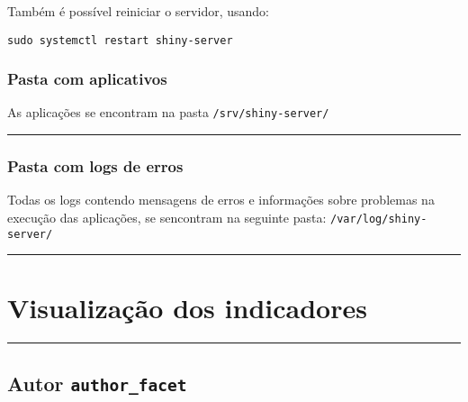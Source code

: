 \documentclass[
]{article}
\begin{document}
Também é possível reiniciar o servidor, usando:

\texttt{sudo\ systemctl\ restart\ shiny-server}

\hypertarget{pasta-com-aplicativos}{%
\subsubsection{Pasta com aplicativos}\label{pasta-com-aplicativos}}

As aplicações se encontram na pasta \texttt{/srv/shiny-server/}

\begin{center}\rule{0.5\linewidth}{0.5pt}\end{center}

\hypertarget{pasta-com-logs-de-erros}{%
\subsubsection{Pasta com logs de erros}\label{pasta-com-logs-de-erros}}

Todas os logs contendo mensagens de erros e informações sobre problemas
na execução das aplicações, se sencontram na seguinte pasta:
\texttt{/var/log/shiny-server/}

\begin{center}\rule{0.5\linewidth}{0.5pt}\end{center}

\hypertarget{visualizauxe7uxe3o-dos-indicadores}{%
\section{Visualização dos
indicadores}\label{visualizauxe7uxe3o-dos-indicadores}}

\begin{center}\rule{0.5\linewidth}{0.5pt}\end{center}

\hypertarget{autor-author_facet}{%
\subsection{\texorpdfstring{Autor
\texttt{author\_facet}}{Autor author\_facet}}\label{autor-author_facet}}
\end{document}
